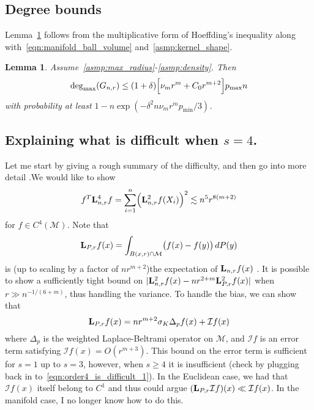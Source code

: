 \documentclass{article}
\newcommand{\1}{\mathbf{1}}
\newcommand{\Lap}{{\bf L}}
\newcommand{\mc}[1]{\mathcal{#1}}
\theoremstyle{alden}
\theoremstyle{aldenthm}
\newtheorem{lemma}{Lemma}
\theoremstyle{definition}
\theoremstyle{remark}
\begin{document}
\subsection{Degree bounds}

Lemma~\ref{lem:max_degree} follows from the multiplicative form of Hoeffding's inequality along with~\eqref{eqn:manifold_ball_volume} and~\ref{asmp:kernel_shape}.
\begin{lemma}
	\label{lem:max_degree}
	Assume~\ref{asmp:max_radius}-\ref{asmp:density}. Then
	\begin{equation*}
	\deg_{\max}(G_{n,r}) \leq (1 + \delta)\Bigl[\nu_mr^m + C_0r^{m + 2}\Bigr] p_{\max} n
	\end{equation*}
	with probability at least $1 - n\exp(-\delta^2 n \nu_m r^m p_{\min}/3)$.
\end{lemma}

\subsection{Explaining what is difficult when $s = 4$.}
\label{subsec:order4_is_difficult}
Let me start by giving a rough summary of the difficulty, and then go into more detail .We would like to show
\begin{equation}
\label{eqn:order4_is_difficult_1}
f^T \Lap_{n,r}^4 f = \sum_{i = 1}^{n} \Bigl(\Lap_{n,r}^2f(X_i)\Bigr)^2 \lesssim n^{5}r^{8(m + 2)}
\end{equation}
for $f \in C^4(\mc{M})$.
Note that
\begin{equation*}
\Lap_{P,r}f(x) = \int_{B(x,r) \cap \mc{M}} \bigl(f(x) - f(y)\bigr) \,dP(y)
\end{equation*}
is (up to scaling by a factor of $nr^{m+2}$)the expectation of $\Lap_{n,r}f(x)$ . It is possible to show a sufficiently tight bound on $|\Lap_{n,r}^2f(x) - nr^{2+m}\Lap_{P,r}^2f(x)|$ when $r \gg n^{-1/(6 + m)}$, thus handling the variance. To handle the bias, we can show that
\begin{equation*}
\Lap_{P,r}f(x) = nr^{m + 2} \sigma_{K} \Delta_pf(x) + \mc{I}f(x)
\end{equation*}
where $\Delta_p$ is the weighted Laplace-Beltrami operator on $\mc{M}$, and $\mc{I}f$ is an error term satisfying $\mc{I}f(x) = O(r^{m + 3})$. This bound on the error term is sufficient for $s = 1$ up to $s = 3$, however, when $s \geq 4$ it is insufficient (check by plugging back in to~\eqref{eqn:order4_is_difficult_1}). In the Euclidean case, we had that $\mc{I}f(x)$ itself belong to $C^1$ and thus could argue $(\Lap_{P,r} \mc{I}f)(x) \ll \mc{I}f(x)$. In the manifold case, I no longer know how to do this.
\end{document}

